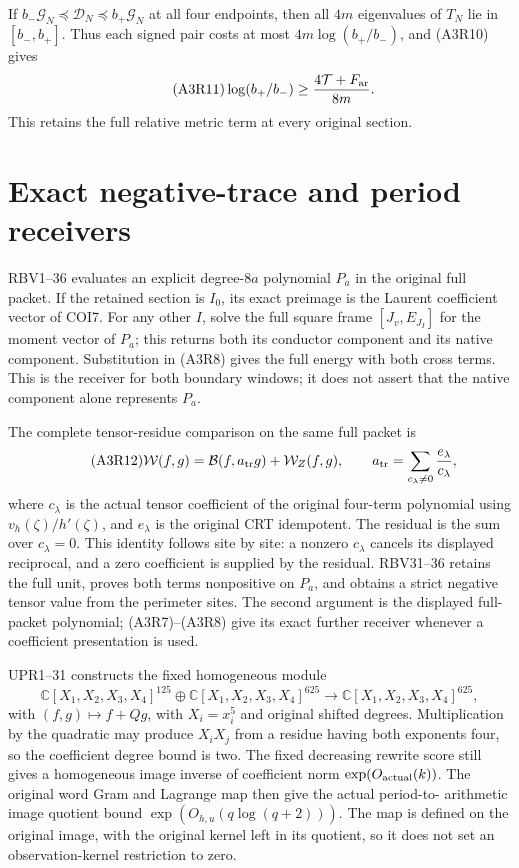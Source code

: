 \documentclass[11pt,a4paper]{article}
\begin{document}
If $b_-\mathscr G_N\preceq\mathscr D_N\preceq b_+\mathscr G_N$
at all four endpoints, then all $4m$ eigenvalues of $T_N$ lie in
$[b_-,b_+]$. Thus each signed pair costs at most
$4m\log(b_+/b_-)$, and (A3R10) gives
\begin{equation}\tag{A3R11}
 \log(b_+/b_-)\ge\frac{4\mathcal T+F_{\rm ar}}{8m}.
\end{equation}
This retains the full relative metric term at every original section.

\section{Exact negative-trace and period receivers}
RBV1--36 evaluates an explicit degree-$8a$ polynomial $P_a$ in the
original full packet. If the retained section is $I_0$, its exact preimage
is the Laurent coefficient vector of COI7. For any other $I$,
solve the full square frame $[J_v,E_{J_I}]$ for the moment vector of $P_a$;
this returns both its conductor component and its native component.
Substitution in (A3R8) gives the full energy with both cross terms.
This is the receiver for both boundary windows; it does not assert that
the native component alone represents $P_a$.

The complete tensor-residue comparison on the same full packet is
\begin{equation}\tag{A3R12}
 \mathcal W(f,g)=\mathcal B(f,a_{\rm tr}g)+\mathcal W_Z(f,g),
 \qquad a_{\rm tr}=\sum_{c_\lambda\ne0}\frac{e_\lambda}{c_\lambda},
\end{equation}
where $c_\lambda$ is the actual tensor coefficient of the original
four-term polynomial using $v_h(\zeta)/h'(\zeta)$, and $e_\lambda$ is the
original CRT idempotent. The residual is the sum over $c_\lambda=0$.
This identity follows site by site: a nonzero $c_\lambda$ cancels its
displayed reciprocal, and a zero coefficient is supplied by the residual.
RBV31--36 retains the full unit, proves both terms nonpositive on $P_a$,
and obtains a strict negative tensor value from the perimeter sites.
The second argument is the displayed full-packet polynomial; (A3R7)--(A3R8)
give its exact further receiver whenever a coefficient presentation is used.

UPR1--31 constructs the fixed homogeneous module
\[
\mathbb C[X_1,X_2,X_3,X_4]^{125}\oplus
\mathbb C[X_1,X_2,X_3,X_4]^{625}\longrightarrow
\mathbb C[X_1,X_2,X_3,X_4]^{625},
\]
with $(f,g)\mapsto f+Qg$,
with $X_i=x_i^5$ and original shifted degrees.
Multiplication by the quadratic may produce $X_iX_j$ from a residue
having both exponents four, so the coefficient degree bound is two.
The fixed decreasing rewrite score still gives a homogeneous image inverse
of coefficient norm $\exp(O_{\rm actual}(k))$.
The original word Gram and Lagrange map then give the actual period-to-
arithmetic image quotient bound $\exp(O_{h,u}(q\log(q+2)))$.
The map is defined on the original image, with the original kernel left
in its quotient, so it does not set an observation-kernel restriction to zero.
\end{document}
